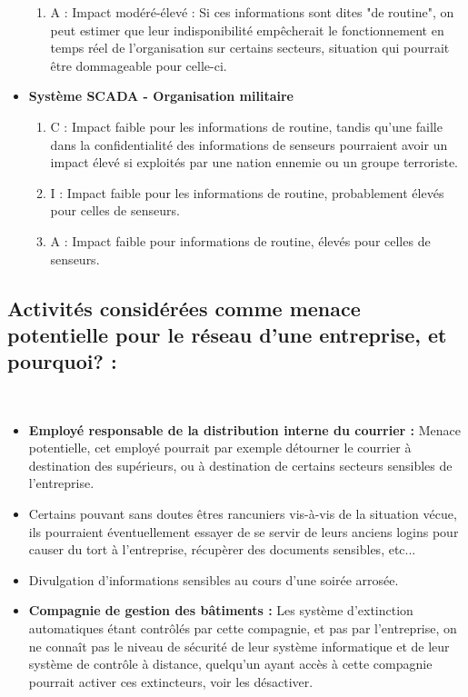 \documentclass{report}
\begin{document}
\begin{itemize}
\begin{enumerate}
						\item A : Impact modéré-élevé : Si ces informations sont dites "de routine", on peut estimer que leur indisponibilité empêcherait le fonctionnement en temps réel de l'organisation sur certains secteurs, situation qui pourrait être dommageable pour celle-ci.\\
					\end{enumerate}
				\item \textbf{Système SCADA - Organisation militaire}
					\begin{enumerate}
						\item C : Impact faible pour les informations de routine, tandis qu'une faille dans la confidentialité des informations de senseurs pourraient avoir un impact élevé si exploités par une nation ennemie ou un groupe terroriste.\\
						\item I : Impact faible pour les informations de routine, probablement élevés pour celles de senseurs.\\
						\item A : Impact faible pour informations de routine, élevés pour celles de senseurs.\\
					\end{enumerate}
			\end{itemize}

		\subsection{Activités considérées comme menace potentielle pour le réseau d'une entreprise, et pourquoi? : }\\
			\begin{itemize}
				\item \textbf{Employé responsable de la distribution interne du courrier : } Menace potentielle, cet employé pourrait par exemple détourner le courrier à destination des supérieurs, ou à destination de certains secteurs sensibles de l'entreprise.\\
				\item {} Certains pouvant sans doutes êtres rancuniers vis-à-vis de la situation vécue, ils pourraient éventuellement essayer de se servir de leurs anciens logins pour causer du tort à l'entreprise, récupèrer des documents sensibles, etc...
				\item {} Divulgation d'informations sensibles au cours d'une soirée arrosée.\\
				\item \textbf{Compagnie de gestion des bâtiments : } Les système d'extinction automatiques étant contrôlés par cette compagnie, et pas par l'entreprise, on ne connaît pas le niveau de sécurité de leur système informatique et de leur système de contrôle à distance, quelqu'un ayant accès à cette compagnie pourrait activer ces extincteurs, voir les désactiver.\\
			\end{itemize}
\end{document}
